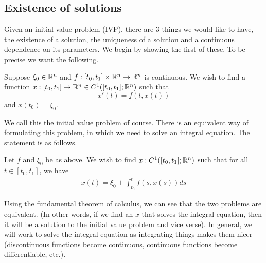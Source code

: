 \subsection{Existence of solutions}
Given an initial value problem (IVP), there are 3 things we would like to have, the existence of a solution, the uniqueness of a solution and a continuous dependence on its parameters. We begin by showing the first of these. To be precise we want the following.

Suppose $\xi_0 \in \mathbb{R}^n$ and $f: [t_0, t_1] \times \mathbb{R}^n \to \mathbb{R}^n$ is continuous. We wish to find a function $x: [t_0, t_1] \to \mathbb{R}^n \in C^1([t_0, t_1]; \mathbb{R}^n)$ such that
$$ x'(t) = f(t, x(t)) $$
and $x(t_0) = \xi_0$.

We call this the initial value problem of course. There is an equivalent way of formulating this problem, in which we need to solve an integral equation. The statement is as follows.

Let $f$ and $\xi_0$ be as above. We wish to find $x: C^1([t_0, t_1]; \mathbb{R}^n)$ such that for all $t \in [t_0, t_1]$, we have
\begin{align*}
    x(t) = \xi_0 + \int_{t_0}^{t} f(s, x(s)) ds
\end{align*}

Using the fundamental theorem of calculus, we can see that the two problems are equivalent. (In other words, if we find an $x$ that solves the integral equation, then it will be a solution to the initial value problem and vice verse). In general, we will work to solve the integral equation as integrating things makes them nicer (discontinuous functions become continuous, continuous functions become differentiable, etc.).

